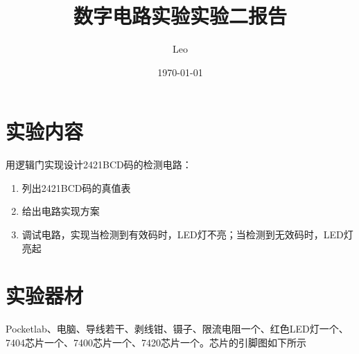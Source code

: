 \documentclass{ctexart}
\title{数字电路实验\quad 实验二报告}
\author{Leo}
\date{\today}
\begin{document}
\maketitle
\section{实验内容}
用逻辑门实现设计2421BCD码的检测电路：
\begin{enumerate}
    \item 列出2421BCD码的真值表
    \item 给出电路实现方案
    \item 调试电路，实现当检测到有效码时，LED灯不亮；当检测到无效码时，LED灯亮起
\end{enumerate}
\section{实验器材}
Pocketlab、电脑、导线若干、剥线钳、镊子、限流电阻一个、红色LED灯一个、7404芯片一个、7400芯片一个、7420芯片一个。芯片的引脚图如下所示
\end{document}

